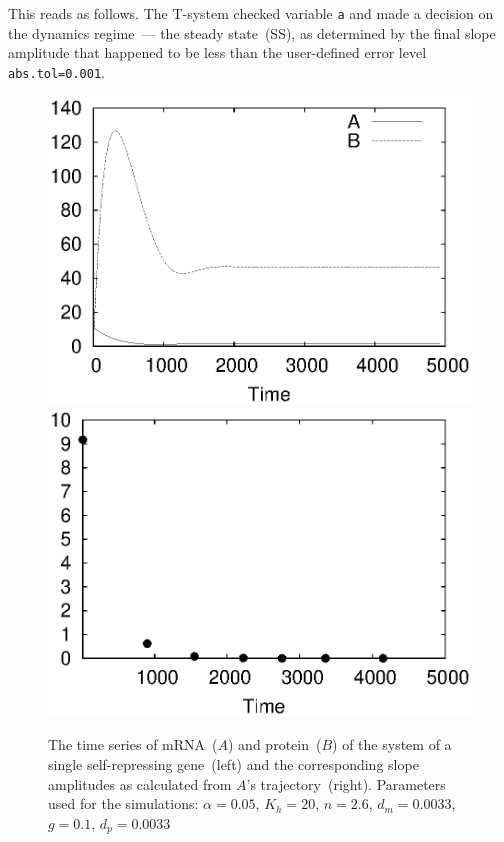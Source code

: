 \documentclass[11pt,a4paper]{article}
\begin{document}
This reads as follows. The T-system checked variable \texttt{a} and made a decision
on the dynamics regime~--- the steady state~(SS), as determined by the final slope
amplitude that happened to be less than the user-defined error level
\texttt{abs.tol=0.001}.

\begin{figure}[h]
  \centering
  \includegraphics[scale=0.47]{single}
  \includegraphics[scale=0.47]{single_samp}
  \caption{The time series of mRNA~($A$) and protein~($B$) of the system of a single
    self-repressing gene~(left) and the corresponding slope amplitudes as calculated
    from $A$'s trajectory~(right). Parameters used for the simulations: $\alpha =
    0.05$, $K_h = 20$, $n = 2.6$, $d_m = 0.0033$, $g = 0.1$, $d_p = 0.0033$}
\label{fig:single_ss}
\end{figure}
\end{document}
